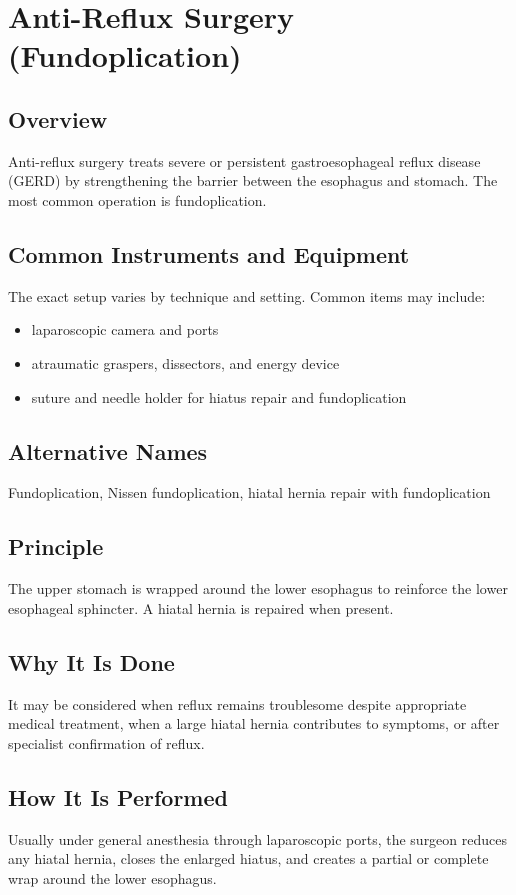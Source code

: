 \chapter{Anti-Reflux Surgery (Fundoplication)}

\section*{Overview}
Anti-reflux surgery treats severe or persistent gastroesophageal reflux disease (GERD) by strengthening the barrier between the esophagus and stomach. The most common operation is fundoplication.

\section*{Common Instruments and Equipment}
The exact setup varies by technique and setting. Common items may include:
\begin{itemize}[nosep,leftmargin=*]
  \item laparoscopic camera and ports
  \item atraumatic graspers, dissectors, and energy device
  \item suture and needle holder for hiatus repair and fundoplication
\end{itemize}

\section*{Alternative Names}
Fundoplication, Nissen fundoplication, hiatal hernia repair with fundoplication

\section*{Principle}
The upper stomach is wrapped around the lower esophagus to reinforce the lower esophageal sphincter. A hiatal hernia is repaired when present.

\section*{Why It Is Done}
It may be considered when reflux remains troublesome despite appropriate medical treatment, when a large hiatal hernia contributes to symptoms, or after specialist confirmation of reflux.

\section*{How It Is Performed}
Usually under general anesthesia through laparoscopic ports, the surgeon reduces any hiatal hernia, closes the enlarged hiatus, and creates a partial or complete wrap around the lower esophagus.

